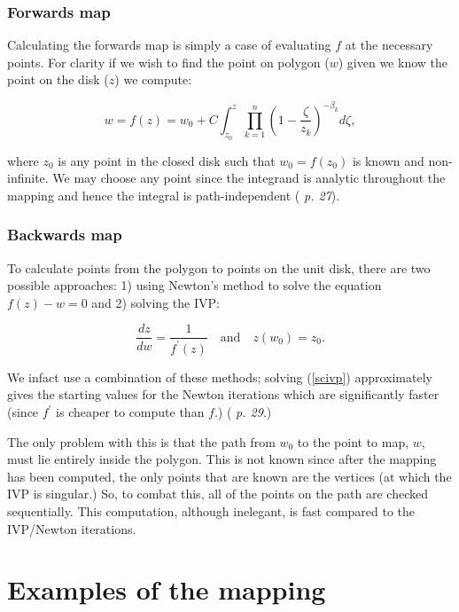\documentclass[a4paper,10pt]{amsart}
\begin{document}
\subsubsection{Forwards map}

Calculating the forwards map is simply a case of evaluating $f$ at the necessary points. For clarity if we wish to find the point on polygon ($w$) given we know the point on the disk ($z$) we compute:

\begin{equation}
\label{unitscmap}
w=f(z) = w_0 + C \int_{z_0}^{z} \prod_{k=1}^{n} (1 - \frac{\zeta}{z_k})^{-\beta_k} d\zeta,
\end{equation}

where $z_0$ is any point in the closed disk such that $w_0 = f(z_0)$ is known and non-infinite. We may choose any point since the integrand is analytic throughout the mapping and hence the integral is path-independent (\cite{driscoll} \emph{p. 27}).


\subsubsection{Backwards map}

To calculate points from the polygon to points on the unit disk, there are two possible approaches: 1) using Newton's method to solve the equation $f(z)-w=0$ and 2) solving the IVP:

\begin{equation}
\label{scivp}
\frac{dz}{dw}=\frac{1}{f^\prime(z)} \quad \text{and} \quad z(w_0)=z_0.
\end{equation}

We infact use a combination of these methods; solving (\ref{scivp}) approximately gives the starting values for the Newton iterations which are significantly faster (since $f^\prime$ is cheaper to compute than $f$.) (\cite{driscoll} \emph{p. 29}.)

The only problem with this is that the path from $w_0$ to the point to map, $w$, must lie entirely inside the polygon. This is not known since after the mapping has been computed, the only points that are known are the vertices (at which the IVP is singular.) So, to combat this, all of the points on the path are checked sequentially. This computation, although inelegant, is fast compared to the IVP/Newton iterations.

\section{Examples of the mapping}
\end{document}
